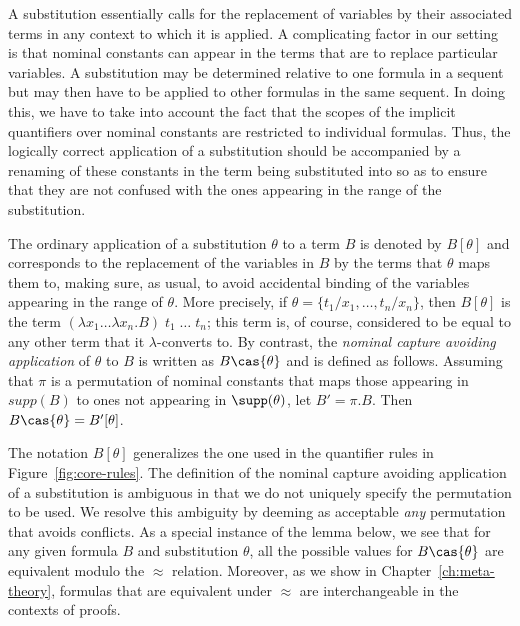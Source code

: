A substitution essentially calls for the replacement of
variables by their associated terms in any context to which it is
applied. A complicating factor in our setting is that nominal
constants can appear in the terms that are to replace
particular variables. A substitution may be determined relative to one
formula in a sequent but may then have to be applied to other formulas
in the same sequent. In doing this, we have to take into account the
fact that the scopes of the implicit quantifiers over nominal
constants are restricted to individual formulas. Thus, the logically
correct application of a substitution should be accompanied by a
renaming of these constants in the term being substituted into so as to
ensure that they are not confused with the ones appearing in
the range of the substitution.

\begin{definition}\label{ncasubst}
The ordinary application of a substitution $\theta$ to a term $B$ is
denoted by $B[\theta]$ and corresponds to the replacement of the
variables in $B$ by the terms that $\theta$ maps them to, making sure,
as usual, to avoid accidental binding of the variables appearing in
the range of $\theta$. More precisely, if $\theta = \{t_1/x_1,\ldots,
t_n/x_n\}$, then $B[\theta]$ is the term $(\lambda x_1\ldots\lambda x_n.B)\;
t_1\; \ldots\; t_n$; this term is, of course, considered to be equal
to any other term that it $\lambda$-converts to. By contrast,
the {\em nominal capture avoiding application} of $\theta$ to $B$ is
written as $B\cas{\theta}$ and is defined as follows. Assuming that
$\pi$ is a permutation of nominal constants that maps those appearing
in $supp(B)$ to ones not appearing in $\supp(\theta)$, let $B' =
\pi.B$. Then $B\cas{\theta} = B'[\theta]$.
\end{definition}

The notation $B[\theta]$ generalizes the one
used in the quantifier rules in Figure~\ref{fig:core-rules}.
The definition of the nominal capture avoiding application of a
substitution is ambiguous in that we do not uniquely specify the
permutation to be used.  We resolve this ambiguity by deeming as
acceptable {\it any} permutation that avoids conflicts. As a special
instance of the lemma below, we see that for any given formula $B$ and
substitution $\theta$,
all the possible values for $B\cas{\theta}$ are equivalent modulo the
$\approx$ relation. Moreover, as we show in
Chapter~\ref{ch:meta-theory}, formulas that are equivalent under
$\approx$ are interchangeable in the contexts of proofs.

